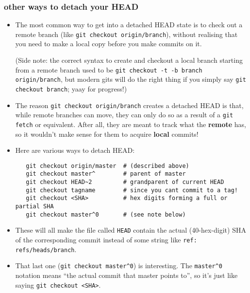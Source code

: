 \documentclass[presentation]{beamer}
\begin{document}
\begin{frame}[fragile]
\frametitle{other ways to detach your HEAD}
\label{sec-10-5}


\tiny

\begin{itemize}
\item The most common way to get into a detached HEAD state is to check out a remote
  branch (like \texttt{git checkout origin/branch}), without realising that you need to
  make a local copy before you make commits on it.

  (Side note: the correct syntax to create and checkout a
  local branch starting from a remote branch used to be \texttt{git checkout -t -b   branch origin/branch}, but modern gits will do the right thing if you simply
  say \texttt{git checkout branch}; yaay for progress!)
\item The reason \texttt{git checkout origin/branch} creates a detached HEAD is that, while
  remote branches can move, they can only do so as a result of a \texttt{git fetch} or
  equivalent.  After all, they are meant to track what the \textbf{remote} has, so it
  wouldn't make sense for them to acquire \textbf{local} commits!
\item Here are various ways to detach HEAD:

\begin{verbatim}
   git checkout origin/master  # (described above)
   git checkout master^        # parent of master
   git checkout HEAD~2         # grandparent of current HEAD
   git checkout tagname        # since you cant commit to a tag!
   git checkout <SHA>          # hex digits forming a full or partial SHA
   git checkout master^0       # (see note below)
\end{verbatim}
\item These will all make the file called \texttt{HEAD} contain the actual
  (40-hex-digit) SHA of the corresponding commit instead of some
  string like \texttt{ref: refs/heads/branch}.
\item That last one (\texttt{git checkout master\textasciicircum{}0}) is interesting.  The
  \texttt{master\textasciicircum{}0} notation means ``the actual commit that master points to'',
  so it's just like saying \texttt{git checkout <SHA>}.
\end{itemize}
\end{frame}
\end{document}
